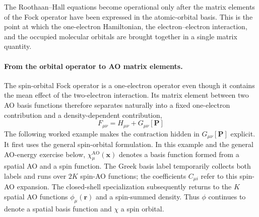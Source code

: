 \documentclass[11pt,a4paper,titlepage]{article}
\numberwithin{equation}{section}
\newcommand{\br}{\boldsymbol{r}}
\newcommand{\bx}{\boldsymbol{x}}
\newcommand{\bP}{\boldsymbol{P}}
\begin{document}
The Roothaan--Hall equations become operational only after the matrix elements
of the Fock operator have been expressed in the atomic-orbital basis. This is
the point at which the one-electron Hamiltonian, the electron--electron
interaction, and the occupied molecular orbitals are brought together in a
single matrix quantity.

\paragraph{From the orbital operator to AO matrix elements.}

The spin-orbital Fock operator is a one-electron operator even though it
contains the mean effect of the two-electron interaction. Its matrix element
between two AO basis functions therefore separates naturally into a fixed
one-electron contribution and a density-dependent contribution,
\begin{equation}
  F_{\mu\nu}
  =
  H_{\mu\nu}
  +
  G_{\mu\nu}[\bP]
\end{equation}
The following worked example makes the contraction hidden in
$G_{\mu\nu}[\bP]$ explicit.
It first uses the general spin-orbital formulation. In this example and the
general AO-energy exercise below, $\chi_\mu^\text{AO}(\bx)$ denotes a
basis function formed from a spatial AO and a spin function. The Greek
basis label temporarily collects both labels and runs over $2K$ spin-AO
functions; the coefficients $C_{\mu i}$ refer to this spin-AO expansion.
The closed-shell specialization subsequently returns to the $K$ spatial
AO functions $\phi_\mu(\br)$ and a spin-summed density. Thus $\phi$
continues to denote a spatial basis function and $\chi$ a spin orbital.
\end{document}

